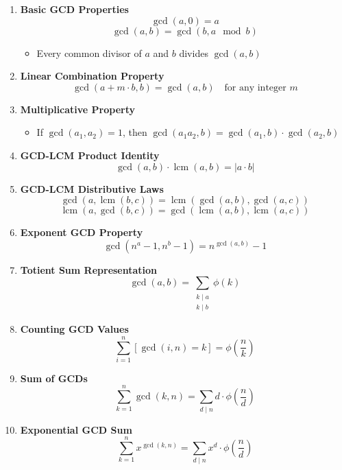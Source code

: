 \begin{enumerate}[leftmargin=*]
    \item \textbf{Basic GCD Properties}
        \[\gcd(a, 0) = a\]
        \[\gcd(a, b) = \gcd(b, a \mod b)\]
        \begin{itemize}
            \item Every common divisor of $a$ and $b$ divides $\gcd(a,b)$
        \end{itemize}
    
    \item \textbf{Linear Combination Property}
        \[\gcd(a + m \cdot b, b) = \gcd(a, b) \quad \text{for any integer } m\]
    
    \item \textbf{Multiplicative Property}
        \begin{itemize}
            \item If $\gcd(a_1, a_2) = 1$, then $\gcd(a_1 a_2, b) = \gcd(a_1, b) \cdot \gcd(a_2, b)$
        \end{itemize}
    
    \item \textbf{GCD-LCM Product Identity}
        \[\gcd(a, b) \cdot \operatorname{lcm}(a, b) = |a \cdot b|\]
    
    \item \textbf{GCD-LCM Distributive Laws}
        \[\gcd(a, \operatorname{lcm}(b, c)) = \operatorname{lcm}(\gcd(a, b), \gcd(a, c))\]
        \[\operatorname{lcm}(a, \gcd(b, c)) = \gcd(\operatorname{lcm}(a, b), \operatorname{lcm}(a, c))\]
    
    \item \textbf{Exponent GCD Property}
        \[\gcd(n^a - 1, n^b - 1) = n^{\gcd(a,b)} - 1\]
    
    \item \textbf{Totient Sum Representation}
        \[\gcd(a, b) = \sum_{\substack{k \mid a \\ k \mid b}} \phi(k)\]
    
    \item \textbf{Counting GCD Values}
        \[\sum_{i=1}^n [\gcd(i, n) = k] = \phi\left(\frac{n}{k}\right)\]
    
    \item \textbf{Sum of GCDs}
        \[\sum_{k=1}^n \gcd(k, n) = \sum_{d \mid n} d \cdot \phi\left(\frac{n}{d}\right)\]
    
    \item \textbf{Exponential GCD Sum}
        \[\sum_{k=1}^n x^{\gcd(k,n)} = \sum_{d \mid n} x^d \cdot \phi\left(\frac{n}{d}\right)\]
    

\end{enumerate}
